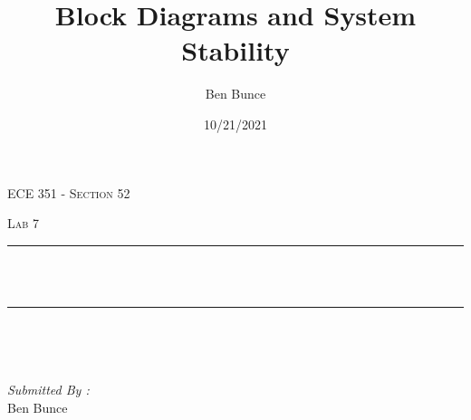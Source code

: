 \documentclass[12pt]{report}
\title{Block Diagrams and System Stability}
\author{Ben Bunce}
\date{10/21/2021}
\makeatletter
\let\thetitle\@title
\makeatother
\begin{document}

\begin{titlepage}
	\centering
    \vspace*{0.5 cm}
\begin{center}    \textsc{\Large   ECE 351 - Section 52}\\[2.0 cm]	\end{center}%
	\textsc{\Large Lab 7  }\\[0.5 cm]				%
	\rule{\linewidth}{0.2 mm} \\[0.4 cm]
	{ \huge \bfseries \thetitle}\\
	\rule{\linewidth}{0.2 mm} \\[1.5 cm]
	
	\begin{minipage}{0.4\textwidth}
		\begin{flushleft} \large
			\end{flushleft}
			\end{minipage}~
			\begin{minipage}{0.4\textwidth}
            
			\begin{flushright} \large
			\emph{Submitted By :} \\
			Ben Bunce  
		\end{flushright}
           
	\end{minipage}\\[2 cm]
	
    
    
    
    
	
\end{titlepage}


\tableofcontents
\pagebreak

\renewcommand{\thesection}{\arabic{section}}
\end{document}
